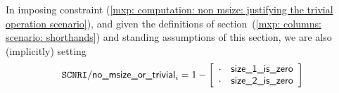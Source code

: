 \saNote{}
In imposing constraint (\ref{mxp: computation: non msize: justifying the trivial operation scenario}),
and given the definitions of section~(\ref{mxp: columns: scenario: shorthands}) and standing assumptions of this section,
we are also (implicitly) setting
\[
	\texttt{SCNRI}\textsf{/}{\textsf{no\_msize\_or\_trivial}} _{i} = 1 - 
	\left[ \begin{array}{cr}
		\cdot & \textsf{size\_1\_is\_zero} \\
		\cdot & \textsf{size\_2\_is\_zero} \\
	\end{array} \right]
\]


